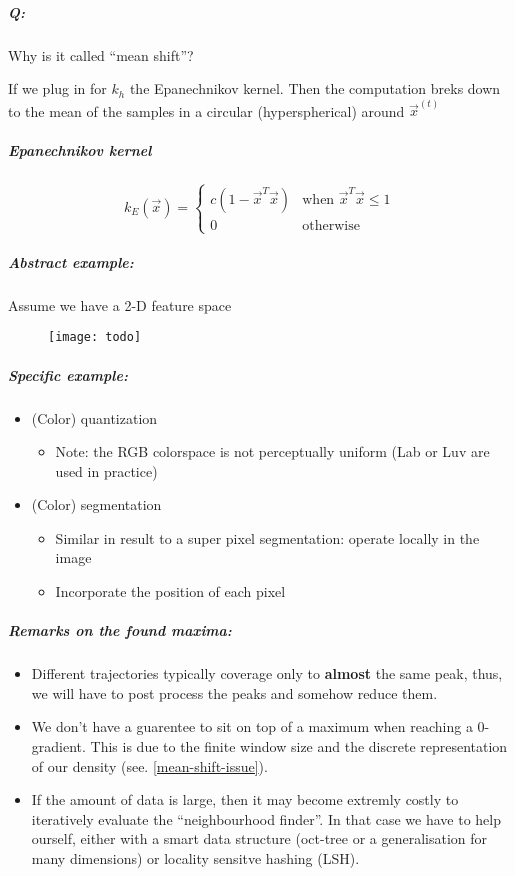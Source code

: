 \subparagraph{Q:} Why is it called ``mean shift''?

If we plug in for $k_h$ the Epanechnikov kernel. Then the computation breks down to the mean of the samples in a circular (hyperspherical) around $\vec{x}^{(t)}$

\subparagraph{Epanechnikov kernel}

\begin{equation*}
  k_E(\vec{x}) = \begin{cases}
    c (1 - \vec{x}^T \vec{x})&\text{when } \vec{x}^T \vec{x} \le 1\\
    0 &\text{otherwise}
  \end{cases}
\end{equation*}

\subparagraph{Abstract example:}
Assume we have a 2-D feature space

\begin{figure}[H]
  \centering
  \texttt{[image: todo]}
\end{figure}

\subparagraph{Specific example:}
\begin{itemize}
  \item (Color) quantization
    \begin{itemize}
      \item Note: the RGB colorspace is not perceptually uniform (Lab or Luv are used in practice)
    \end{itemize}
  \item (Color) segmentation
    \begin{itemize}
      \item Similar in result to a super pixel segmentation: operate locally in the image
      \item Incorporate the position of each pixel
    \end{itemize}
\end{itemize}

\subparagraph{Remarks on the found maxima:}
\begin{itemize}
  \item Different trajectories typically coverage only to \textbf{almost} the same peak, thus, we will have to post process the peaks and somehow reduce them.
  \item We don't have a guarentee to sit on top of a maximum when reaching a 0-gradient. This is due to the finite window size and the discrete representation of our density (see. \ref{mean-shift-issue}).
  \item If the amount of data is large, then it may become extremly costly to iteratively evaluate the ``neighbourhood finder''. In that case we have to help ourself, either with a smart data structure (oct-tree or a generalisation for many dimensions) or locality sensitve hashing (LSH).
\end{itemize}
